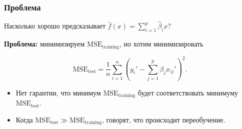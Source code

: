 \documentclass[unicode, notheorems]{beamer}
\newcommand{\E}{\mathbb{E}}
\begin{document}
\begin{frame}
\frametitle{Проблема}

Насколько хорошо предсказывает $\hat{f}(x) = \sum_{i=1}^p \hat{\beta}_i x$?

\vspace{0.5cm}

\textbf{Проблема:} минимизируем $\mathrm{MSE}_{\mathrm{training}}$, но хотим минимизировать 

\[\mathrm{MSE}_{\mathrm{test}} = \frac{1}{n}\sum_{i=1}^n(y_i' - \sum_{j=1}^p \beta_j x_{ij}')^2.\]
\vspace{0.3cm}

\begin{itemize}
\item Нет гарантии, что минимум $\mathrm{MSE}_{\mathrm{training}}$ будет соответствовать минимуму $\mathrm{MSE}_{\mathrm{test}}$.
\item Когда $\mathrm{MSE}_{\mathrm{test}} \gg \mathrm{MSE}_{\mathrm{training}}  $, говорят, что происходит переобучение.
\end{itemize}



%




\end{frame}
\end{document}
